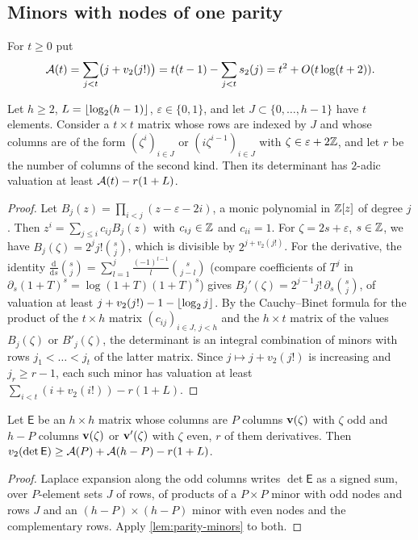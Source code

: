 \subsection{Minors with nodes of one parity}\label{subsec:parity-minors}

For $t\ge0$ put
\[
  \mathcal{A}(t)=\sum_{j<t}\bigl(j+v_2(j!)\bigr)=t(t-1)-\sum_{j<t}s_2(j)=t^2+O(t\log(t+2)).
\]

\begin{lemma}\label{lem:parity-minors}
Let $h\ge2$, $L=\left\lfloor \log_2(h-1)\right\rfloor$, $\varepsilon\in\{0,1\}$, and let $J\subset\{0,\dots,h-1\}$
have $t$ elements. Consider a $t\times t$ matrix whose rows are indexed by $J$ and whose columns
are of the form $(\zeta^i)_{i\in J}$ or $(i\zeta^{i-1})_{i\in J}$ with
$\zeta\in\varepsilon+2\mathbb{Z}$, and let $r$ be the number of columns of the second kind. Then its
determinant has $2$-adic valuation at least $\mathcal{A}(t)-r(1+L)$.
\end{lemma}

\begin{proof}
Let $B_j(z)=\prod_{i<j}(z-\varepsilon-2i)$, a monic polynomial in $\mathbb{Z}[z]$ of degree $j$. Then
$z^i=\sum_{j\le i}c_{ij}B_j(z)$ with $c_{ij}\in\mathbb{Z}$ and $c_{ii}=1$. For $\zeta=2s+\varepsilon$,
$s\in\mathbb{Z}$, we have $B_j(\zeta)=2^jj!\binom sj$, which is divisible by $2^{j+v_2(j!)}$. For the
derivative, the identity $\frac{\mathrm d}{\mathrm ds}\binom sj=\sum_{l=1}^{j}
\frac{(-1)^{l-1}}{l}\binom s{j-l}$ (compare coefficients of $T^j$ in
$\partial_s(1+T)^s=\log(1+T)(1+T)^s$) gives $B_j'(\zeta)=2^{j-1}j!\,\partial_s\binom sj$, of
valuation at least $j+v_2(j!)-1-\left\lfloor \log_2j\right\rfloor$. By the Cauchy--Binet formula for the product
of the $t\times h$ matrix $(c_{ij})_{i\in J,\,j<h}$ and the $h\times t$ matrix of the values
$B_j(\zeta)$ or $B'_j(\zeta)$, the determinant is an integral combination of minors with rows
$j_1<\dots<j_t$ of the latter matrix. Since $j\mapsto j+v_2(j!)$ is increasing and
$j_r\ge r-1$, each such minor has valuation at least $\sum_{i<t}(i+v_2(i!))-r(1+L)$.
\end{proof}

\begin{corollary}\label{cor:parity-laplace}
Let $\mathsf E$ be an $h\times h$ matrix whose columns are $P$ columns $\mathbf{v}(\zeta)$ with $\zeta$ odd
and $h-P$ columns $\mathbf{v}(\zeta)$ or $\mathbf{v}'(\zeta)$ with $\zeta$ even, $r$ of them derivatives.
Then $v_2(\det\mathsf E)\ge\mathcal{A}(P)+\mathcal{A}(h-P)-r(1+L)$.
\end{corollary}

\begin{proof}
Laplace expansion along the odd columns writes $\det\mathsf E$ as a signed sum, over $P$-element sets
$J$ of rows, of products of a $P\times P$ minor with odd nodes and rows $J$ and an
$(h-P)\times(h-P)$ minor with even nodes and the complementary rows. Apply
\cref{lem:parity-minors} to both.
\end{proof}

